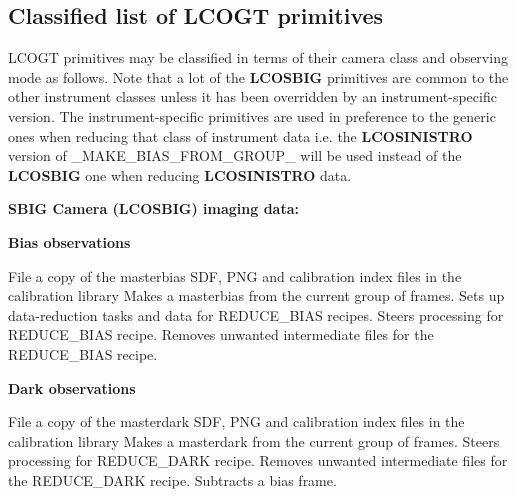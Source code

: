 \documentclass[twoside,11pt,nolof]{starlink}
\providecommand{\task}[1]{\textsf{#1}}
\begin{document}
\newpage
\begin{small}
\section{Classified list of LCOGT primitives\label{ap:classified}}

LCOGT primitives may be classified in terms of their camera class and observing
mode as follows. Note that a lot of the \textbf{LCOSBIG} primitives are common to
the other instrument classes unless it has been overridden by an
instrument-specific version. The instrument-specific primitives are used in
preference to the generic ones when reducing that class of instrument data i.e.
the \textbf{LCOSINISTRO} version of \task{\_MAKE\_BIAS\_FROM\_GROUP\_} will be used
instead of the \textbf{LCOSBIG} one when reducing \textbf{LCOSINISTRO} data.


{\large
\begin{center}
\textbf{SBIG Camera (LCOSBIG) imaging data:}
\end{center}
}


{\large
\begin{center}
\textbf{Bias observations}
\end{center}
}
\begin{description}
File a copy of the masterbias SDF, PNG and calibration index files in the
calibration library
Makes a masterbias from the current group of frames.
Sets up data-reduction tasks and data for REDUCE\_BIAS recipes.
Steers processing for REDUCE\_BIAS recipe.
Removes unwanted intermediate files for the REDUCE\_BIAS recipe.
\end{description}

{\large
\begin{center}
\textbf{Dark observations}
\end{center}
}
\begin{description}
File a copy of the masterdark SDF, PNG and calibration index files in the
calibration library
Makes a masterdark from the current group of frames.
Steers processing for REDUCE\_DARK recipe.
Removes unwanted intermediate files for the REDUCE\_DARK recipe.
Subtracts a bias frame.
\end{description}


\end{small}
\end{document}
